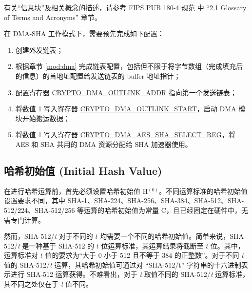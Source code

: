 \documentclass[main\_\_CN.tex]{subfiles}
\begin{document}
\begin{tiplisting}
\vspace{-0.5em}
有关“信息块”及相关概念的描述，请参考 \href{https://doi.org/10.6028/NIST.FIPS.180-4}{FIPS PUB 180-4 规范} 中 “2.1 Glossary of Terms and Acronyms” 章节。
\end{tiplisting}

在 DMA-SHA 工作模式下，需要预先完成如下配置：
\begin{enumerate}
    \item 创建外发链表；
    \item 根据章节 \ref{mod:dma} \textit{} 完成链表配置，包括但不限于将字节数组（完成填充后的信息）的首地址配置给发送链表的 buffer 地址指针；
    \item 配置寄存器 \hyperref[fielddesc:CRYPTODMAOUTLINKADDR]{CRYPTO\_DMA\_OUTLINK\_ADDR} 指向第一个发送链表；
    \item 将数值 1 写入寄存器 \hyperref[fielddesc:CRYPTODMAOUTLINKSTART]{CRYPTO\_DMA\_OUTLINK\_START}，启动 DMA 模块开始搬运数据；
    \item 将数值 1 写入寄存器 \hyperref[regdesc:CRYPTODMAAESSHASELECTREG]{CRYPTO\_DMA\_AES\_SHA\_SELECT\_REG}，将 AES 和 SHA 共用的 DMA 资源分配给 SHA 加速器使用。
\end{enumerate}


\subsection{哈希初始值 (Initial Hash Value)}\label{initialhash}
在进行哈希运算前，首先必须设置哈希初始值 H$^{(0)}$。不同运算标准的哈希初始值设置要求不同，其中 SHA-1、SHA-224、SHA-256、SHA-384、SHA-512、SHA-512/224、SHA-512/256 等运算的哈希初始值为常量 C，且已经固定在硬件中，无需专门计算。

然而，SHA-512/{\it{t}} 对于不同的 \begin{math}t\end{math} 均需要一个不同的哈希初始值。简单来说，SHA-512/{\it{t}} 是一种基于 SHA-512 的 \begin{math}t\end{math} 位运算标准，其运算结果将截断至 \begin{math}t\end{math} 位。其中，运算标准对 \begin{math}t\end{math} 值的要求为“大于 0 小于 512 且不等于 384 的正整数”。对于不同 {\it{t}} 值的 SHA-512/{\it{t}} 运算，其哈希初始值可通过对 ``SHA-512/t” 字符串的十六进制表示进行 SHA-512 运算获得。不难看出，对于 {\it{t}} 取值不同的 SHA-512/{\it{t}} 运算标准，其不同之处仅在于 {\it{t}} 值不同。
\end{document}
